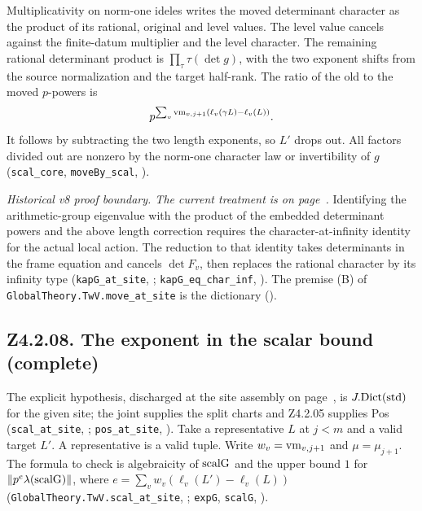 Multiplicativity on norm-one ideles writes the moved determinant character as the product of its rational, original and level values. The level value cancels against the finite-datum multiplier and the level character. The remaining rational determinant product is \(\prod_\tau\tau(\det g)\), with the two exponent shifts from the source normalization and the target half-rank. The ratio of the old to the moved \(p\)-powers is
\[
p^{\sum_v {\rm vm}_{v,j+1}(\ell_v(\gamma L)-\ell_v(L))}.
\]
It follows by subtracting the two length exponents, so \(L'\) drops out. All factors divided out are nonzero by the norm-one character law or invertibility of \(g\) (\nolinkurl{scal_core}, \nolinkurl{moveBy_scal}, ).

\emph{Historical v8 proof boundary. The current treatment is on page~\pageref{r8:Z4.2.06}.} Identifying the arithmetic-group eigenvalue with the product of the embedded determinant powers and the above length correction requires the character-at-infinity identity for the actual local action. The reduction to that identity takes determinants in the frame equation and cancels \(\det F_v\), then replaces the rational character by its infinity type (\nolinkurl{kapG_at_site}, ; \nolinkurl{kapG_eq_char_inf}, ). The premise (B) of \nolinkurl{GlobalTheory.TwV.move_at_site} is the dictionary ().

\subsection{Z4.2.08. The exponent in the scalar bound (complete)}\label{r6:Z4.2.08}
The explicit hypothesis, discharged at the site assembly on page~\pageref{r7:review:Z4.2.08}, is \(J.{\rm Dict}(\mathrm{std})\) for the given site; the joint supplies the split charts and Z4.2.05 supplies Pos (\nolinkurl{scal_at_site}, ; \nolinkurl{pos_at_site}, ). Take a representative \(L\) at \(j<m\) and a valid target \(L'\). A representative is a valid tuple. Write \(w_v={\rm vm}_{v,j+1}\) and \(\mu=\mu_{j+1}\). The formula to check is algebraicity of \({\rm scalG}\) and the upper bound \(1\) for \(\lVert p^e\lambda({\rm scalG})\rVert\), where
\(e=\sum_v w_v(\ell_v(L')-\ell_v(L))\)
(\nolinkurl{GlobalTheory.TwV.scal_at_site}, ; \nolinkurl{expG}, \nolinkurl{scalG}, ).

